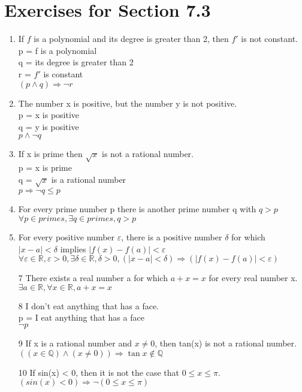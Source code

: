 \documentclass[12pt]{article}
\begin{document}
\section*{Exercises for Section 7.3}
\begin{enumerate}
	\item If $f$ is a polynomial and its degree is greater than 2, then $f'$ is not constant.\\
	    p = f is a polynomial\\
	    q = its degree is greater than 2\\
	    r = $f'$ is constant\\
	    $(p \land q) \Rightarrow \neg r$
	\item The number x is positive, but the number y is not positive.\\
	    p = x is positive\\
	    q = y is positive\\
	    $p \land \neg q$
	\item If x is prime then $\sqrt{x}$ is not a rational number.\\
	    p = x is prime\\
	    q = $\sqrt{x}$ is a rational number\\
	    $p \Rightarrow \neg q\le p$
	\item For every prime number p there is another prime number q with $q>p$\\
	    $\forall p \in primes, \exists q \in primes, q > p$
	\item For every positive number $\varepsilon$, there is a positive number $\delta$ for which $|x-a| < \delta$ implies $|f(x) - f(a)| < \varepsilon$\\
	    $\forall \varepsilon \in \mathbb{R}, \varepsilon > 0, \exists \delta \in \mathbb{R}, \delta > 0, (|x-a| < \delta) \Rightarrow (|f(x) - f(a)| < \varepsilon)$
	\item [7] There exists a real number a for which $a+x=x$ for every real number x.\\
	    $\exists a \in \mathbb{R}, \forall x \in \mathbb{R}, a+x=x$
	\item [8] I don't eat anything that has a face.\\
	    p = I eat anything that has a face\\
	    $\neg p$
	\item [9] If x is a rational number and $x\neq 0$, then tan(x) is not a rational number.\\
	    $((x\in \mathbb{Q}) \land (x \neq 0)) \Rightarrow \tan{x} \notin \mathbb{ Q}$
	\item [10] If sin(x) < 0, then it is not the case that $0\le x \leq \pi$.\\
	    $(sin(x) < 0) \Rightarrow \neg(0\le x \le \pi)$
\end{enumerate}
\end{document}
